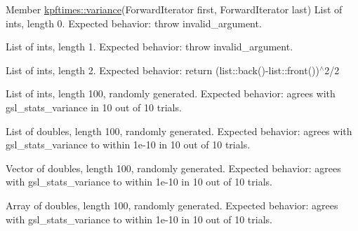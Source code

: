 \label{test__test000011}
\hypertarget{test__test000011}{}
 
\begin{DoxyDescription}
\item[Member \hyperlink{group__util_ga2c5ce34d5fee9b6101fc1f617377ffc8}{kpftimes::variance}(ForwardIterator first, ForwardIterator last) ]List of ints, length 0. Expected behavior: throw invalid\_\-argument. 

List of ints, length 1. Expected behavior: throw invalid\_\-argument. 

List of ints, length 2. Expected behavior: return (list::back()-\/list::front())$^\wedge$2/2 

List of ints, length 100, randomly generated. Expected behavior: agrees with gsl\_\-stats\_\-variance in 10 out of 10 trials. 

List of doubles, length 100, randomly generated. Expected behavior: agrees with gsl\_\-stats\_\-variance to within 1e-\/10 in 10 out of 10 trials. 

Vector of doubles, length 100, randomly generated. Expected behavior: agrees with gsl\_\-stats\_\-variance to within 1e-\/10 in 10 out of 10 trials. 

Array of doubles, length 100, randomly generated. Expected behavior: agrees with gsl\_\-stats\_\-variance to within 1e-\/10 in 10 out of 10 trials. 
\end{DoxyDescription}